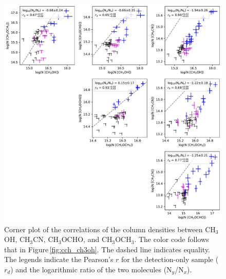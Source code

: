 \documentclass[twocolumn]{aastex62}
\newcommand{\methylformate}{\mbox{CH$_{3}$OCHO}}
\newcommand{\methanol}{\mbox{CH$_{3}$OH}}
\newcommand{\dimethylether}{\mbox{CH$_{3}$OCH$_{3}$}}
\newcommand{\methylcyanide}{\mbox{CH$_{3}$CN}}
\begin{document}
\begin{figure}[htbp!]
  \centering
  \includegraphics[width=\textwidth]{corner_Ncol_correlations.pdf}
  \caption{Corner plot of the correlations of the column densities between \methanol, \methylcyanide, \methylformate, and \dimethylether.  The color code follows that in Figure\,\ref{fig:cch_ch3oh}.  The dashed line indicates equality.  The legends indicate the Pearson's $r$ for the detection-only sample ($r_{d}$) and the logarithmic ratio of the two molecules (N$_{y}$/N$_{x}$).}
  \label{fig:corner}
\end{figure}
\end{document}
